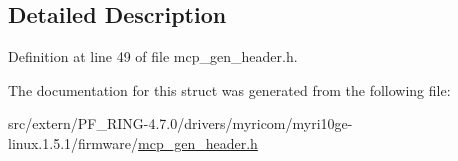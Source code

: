 \subsection{Detailed Description}


Definition at line 49 of file mcp\_\-gen\_\-header.h.



The documentation for this struct was generated from the following file:\begin{DoxyCompactItemize}
\item 
src/extern/PF\_\-RING-\/4.7.0/drivers/myricom/myri10ge-\/linux.1.5.1/firmware/\hyperlink{mcp__gen__header_8h}{mcp\_\-gen\_\-header.h}\end{DoxyCompactItemize}
